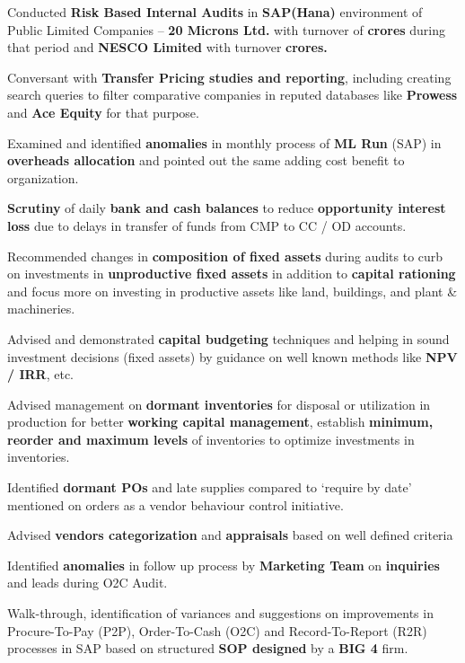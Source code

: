 \documentclass[a4paper,11pt]{article}
\begin{document}
		\item {Conducted \textbf{Risk Based Internal Audits} in \textbf{SAP(Hana)} environment of Public Limited Companies – \textbf{20 Microns Ltd.} with turnover of \textbf{ crores} during that period and \textbf{NESCO Limited} with turnover \textbf{ crores.}}
		\item {Conversant with \textbf{Transfer Pricing studies and reporting}, including creating search queries to filter comparative companies in reputed databases like \textbf{Prowess} and \textbf{Ace Equity} for that purpose.}
		\item {Examined and identified \textbf{anomalies} in monthly process of \textbf{ML Run} (SAP) in \textbf{overheads allocation} and pointed out the same adding cost benefit to organization.}
		\item {\textbf{Scrutiny} of daily \textbf{bank and cash balances} to reduce \textbf{opportunity interest loss} due to delays in transfer of funds from CMP to CC / OD accounts.}
		\item {Recommended changes in \textbf{composition of fixed assets} during audits to curb on investments in \textbf{unproductive fixed assets} in addition to \textbf{capital rationing} and focus more on investing in productive assets like land, buildings, and plant \& machineries.}
		\item {Advised and demonstrated \textbf{capital budgeting} techniques and helping in sound investment decisions (fixed assets) by guidance on well known methods like \textbf{NPV / IRR}, etc.}
		\item {Advised management on \textbf{dormant inventories} for disposal or utilization in production for better \textbf{working capital management}, establish \textbf{minimum, reorder and maximum levels} of inventories to optimize investments in inventories. }
		\item {Identified \textbf{dormant POs} and late supplies compared to ‘require by date’ mentioned on orders as a vendor behaviour control initiative.}
		\item {Advised \textbf{vendors categorization} and \textbf{appraisals} based on well defined criteria}
		\item {Identified \textbf{anomalies} in follow up process by \textbf{Marketing Team} on \textbf{inquiries} and leads during O2C Audit.}
		\item {Walk-through, identification of variances and suggestions on improvements in Procure-To-Pay (P2P), Order-To-Cash (O2C) and Record-To-Report (R2R) processes in SAP based on structured \textbf{SOP designed} by a \textbf{BIG 4} firm.}
\end{document}
